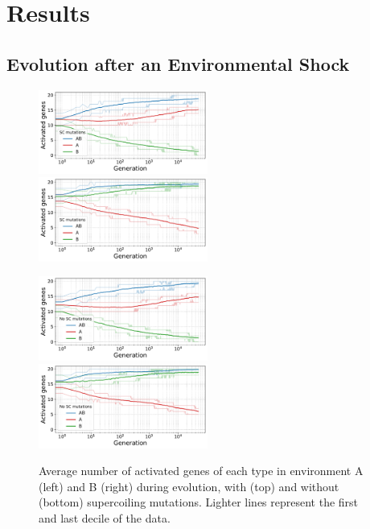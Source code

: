 \section{Results}

\subsection{Evolution after an Environmental Shock}

\begin{figure}[H]
\centering
\includegraphics[width=0.495\textwidth]{epistasis/img/with-sc/gene_activity_env_A.pdf}
\includegraphics[width=0.495\textwidth]{epistasis/img/with-sc/gene_activity_env_B.pdf}

\includegraphics[width=0.495\textwidth]{epistasis/img/control/gene_activity_env_A.pdf}
\includegraphics[width=0.495\textwidth]{epistasis/img/control/gene_activity_env_B.pdf}
\caption[Evolution of the number of activated genes in each environment, with a]{Average number of activated genes of each type in environment A (left) and B (right) during evolution, with (top) and without (bottom) supercoiling mutations.
Lighter lines represent the first and last decile of the data.}
\label{fig:epistasis:activ-by-env}
\end{figure}

